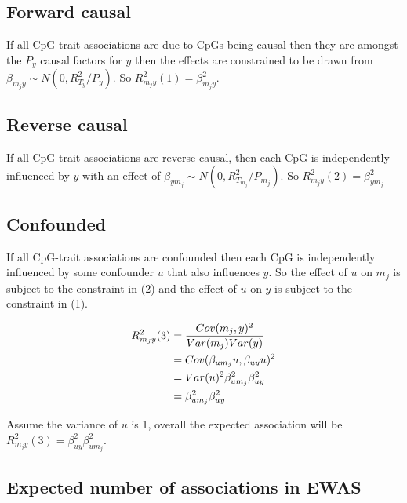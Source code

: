 \documentclass[
]{article}
\begin{document}
\hypertarget{forward-causal}{%
\subsection{Forward causal}\label{forward-causal}}

If all CpG-trait associations are due to CpGs being causal then they are amongst the \(P_y\) causal factors for \(y\) then the effects are constrained to be drawn from \(\beta_{m_jy} \sim N(0, R^2_{T_y}/P_y)\). So \(R^2_{m_jy}(1) = \beta_{m_jy}^2\).

\hypertarget{reverse-causal}{%
\subsection{Reverse causal}\label{reverse-causal}}

If all CpG-trait associations are reverse causal, then each CpG is independently influenced by \(y\) with an effect of \(\beta_{ym_j} \sim N(0, R^2_{T_{m_j}}/P_{m_j})\). So \(R^2_{m_jy}(2) = \beta_{ym_j}^2\)

\hypertarget{confounded}{%
\subsection{Confounded}\label{confounded}}

If all CpG-trait associations are confounded then each CpG is independently influenced by some confounder \(u\) that also influences \(y\). So the effect of \(u\) on \(m_j\) is subject to the constraint in (2) and the effect of \(u\) on \(y\) is subject to the constraint in (1).

\begin{align}
  R^2_{m_jy}(3) & = \frac{Cov(m_j, y)^2} {Var(m_j)Var(y)} \notag \\
  & = Cov(\beta_{um_j}u, \beta_{uy}u)^2 \notag \\
  & = Var(u)^2\beta_{um_j}^2\beta_{uy}^2 \notag \\
  & = \beta_{um_j}^2\beta_{uy}^2 \notag
  \label{eq:confounding-variance}
\end{align}

Assume the variance of \(u\) is 1, overall the expected association will be \(R^2_{m_jy}(3) = \beta_{uy}^2\beta_{um_j}^2\).

\hypertarget{expected-number-of-associations-in-ewas}{%
\subsection{Expected number of associations in EWAS}\label{expected-number-of-associations-in-ewas}}
\end{document}
